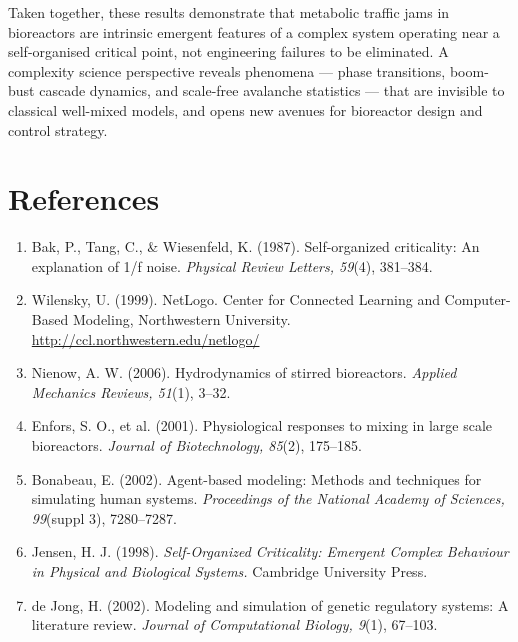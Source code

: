 \documentclass[12pt]{article}
\begin{document}
Taken together, these results demonstrate that metabolic traffic jams in 
bioreactors are intrinsic emergent features of a complex system operating 
near a self-organised critical point, not engineering failures to be 
eliminated. A complexity science perspective reveals phenomena --- phase 
transitions, boom-bust cascade dynamics, and scale-free avalanche statistics 
--- that are invisible to classical well-mixed models, and opens new avenues 
for bioreactor design and control strategy.

\section{References}

\begin{enumerate}[leftmargin=2em, label=\arabic*.]
  \item Bak, P., Tang, C., \& Wiesenfeld, K. (1987). Self-organized criticality: An explanation of 1/f noise. \textit{Physical Review Letters, 59}(4), 381--384.

  \item Wilensky, U. (1999). NetLogo. Center for Connected Learning and Computer-Based Modeling, Northwestern University. \url{http://ccl.northwestern.edu/netlogo/}

  \item Nienow, A. W. (2006). Hydrodynamics of stirred bioreactors. \textit{Applied Mechanics Reviews, 51}(1), 3--32.

  \item Enfors, S. O., et al. (2001). Physiological responses to mixing in large scale bioreactors. \textit{Journal of Biotechnology, 85}(2), 175--185.

  \item Bonabeau, E. (2002). Agent-based modeling: Methods and techniques for simulating human systems. \textit{Proceedings of the National Academy of Sciences, 99}(suppl 3), 7280--7287.

  \item Jensen, H. J. (1998). \textit{Self-Organized Criticality: Emergent Complex Behaviour in Physical and Biological Systems.} Cambridge University Press.

  \item de Jong, H. (2002). Modeling and simulation of genetic regulatory systems: A literature review. \textit{Journal of Computational Biology, 9}(1), 67--103.
\end{enumerate}
\end{document}
